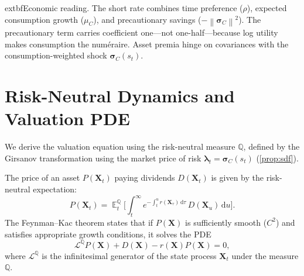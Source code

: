 ﻿\documentclass[11pt,letterpaper,oneside]{article}
\numberwithin{equation}{section}
\DeclareMathOperator{\E}{\mathbb{E}}
\newcommand{\1}{\mathbf{1}}
\newcommand{\diff}{\mathrm{d}}
\newcommand{\norm}[1]{\left\lVert #1\right\rVert}
\begin{document}
\begin{tcolorbox}[didacticstyle]
  	extbf{Economic reading.} The short rate combines time preference ($\rho$), expected consumption growth ($\mu_C$), and precautionary savings ($-\norm{\bm{\sigma}_C}^2$). The precautionary term carries coefficient one---not one-half---because log utility makes consumption the num\'eraire. Asset premia hinge on covariances with the consumption-weighted shock $\bm{\sigma}_C(s_t)$.
\end{tcolorbox}

\section{Risk-Neutral Dynamics and Valuation PDE}\label{sec:pde}

We derive the valuation equation using the risk-neutral measure $\mathbb{Q}$, defined by the Girsanov transformation using the market price of risk $\bm{\lambda}_t=\bm{\sigma}_C(s_t)$ (\cref{prop:sdf}).

\begin{tcolorbox}[mathstyle, title={Feynman--Kac Theorem and Valuation}]
The price of an asset $P(\bm{X}_t)$ paying dividends $D(\bm{X}_t)$ is given by the risk-neutral expectation:
\[
  P(\bm{X}_t) = \E^{\mathbb{Q}}_t\Big[\int_t^\infty e^{-\int_t^u r(\bm{X}_\tau)\,\diff\tau} \, D(\bm{X}_u)\,\diff u\Big].
\]
The Feynman--Kac theorem states that if $P(\bm{X})$ is sufficiently smooth ($C^2$) and satisfies appropriate growth conditions, it solves the PDE
\[
  \mathcal{L}^{\mathbb{Q}} P(\bm{X}) + D(\bm{X}) - r(\bm{X}) P(\bm{X}) = 0,
\]
where $\mathcal{L}^{\mathbb{Q}}$ is the infinitesimal generator of the state process $\bm{X}_t$ under the measure $\mathbb{Q}$.
\end{tcolorbox}
\end{document}

